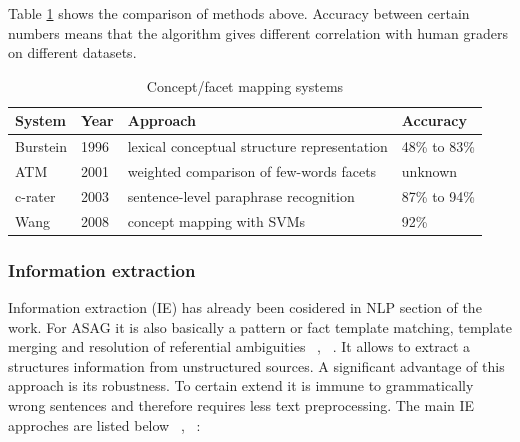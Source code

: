 Table \ref{CFM} shows the comparison of methods above. Accuracy between certain numbers means that the algorithm gives different correlation with human graders on different datasets.

\begin{table}[h!]
\centering
\caption{Concept/facet mapping systems}
\label{CFM}
\begin{tabular}{|l|l|l|l|}
\hline
 System & Year & Approach & Accuracy \\ \hline
 Burstein & 1996 & lexical conceptual structure representation & 48\% to 83\% \\ \hline
 ATM & 2001 & weighted comparison of few-words facets & unknown \\ \hline
 c-rater & 2003 & sentence-level paraphrase recognition & 87\% to 94\% \\ \hline
 Wang & 2008 & concept mapping with SVMs & 92\% \\ \hline
\end{tabular}
\end{table}

\subsubsection{Information extraction}

Information extraction (IE) has already been cosidered in NLP section of the work. For ASAG it is also basically a pattern or fact template matching, template merging and resolution of referential ambiguities ~\cite{Burrows}, ~\cite{Pulman}. It allows to extract a structures information from unstructured sources. A significant advantage of this approach is its robustness. To certain extend it is immune to grammatically wrong sentences and therefore requires less text preprocessing. The main IE approches are listed below ~\cite{Hasanah}, ~\cite{Pulman}: 

